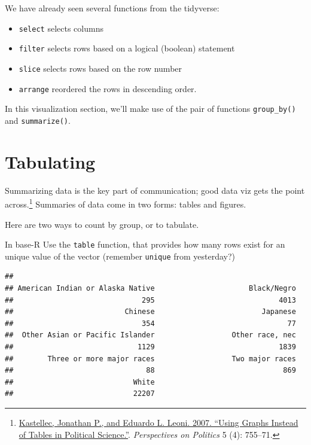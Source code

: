 \documentclass[]{book}
\newenvironment{Shaded}{\begin{snugshade}}{\end{snugshade}}
\newcommand{\KeywordTok}[1]{\textcolor[rgb]{0.13,0.29,0.53}{\textbf{#1}}}
\newcommand{\OperatorTok}[1]{\textcolor[rgb]{0.81,0.36,0.00}{\textbf{#1}}}
\newcommand{\NormalTok}[1]{#1}
\providecommand{\tightlist}{%
  \setlength{\itemsep}{0pt}\setlength{\parskip}{0pt}}
\let\rmarkdownfootnote\footnote%
\def\footnote{\protect\rmarkdownfootnote}
\theoremstyle{definition}
\theoremstyle{definition}
\theoremstyle{definition}
\theoremstyle{remark}
\begin{document}
We have already seen several functions from the tidyverse:

\begin{itemize}
\tightlist
\item
  \texttt{select} selects columns
\item
  \texttt{filter} selects rows based on a logical (boolean) statement
\item
  \texttt{slice} selects rows based on the row number
\item
  \texttt{arrange} reordered the rows in descending order.
\end{itemize}

In this visualization section, we'll make use of the pair of functions
\texttt{group\_by()} and \texttt{summarize()}.

\section{Tabulating}\label{tabulating}

Summarizing data is the key part of communication; good data viz gets
the point across.\footnote{\href{http://www.princeton.edu/~jkastell/Tables2Graphs/graphs.pdf}{Kastellec,
  Jonathan P., and Eduardo L. Leoni. 2007. ``Using Graphs Instead of
  Tables in Political Science.''}. \emph{Perspectives on Politics} 5
  (4): 755--71.} Summaries of data come in two forms: tables and
figures.

Here are two ways to count by group, or to tabulate.

In base-R Use the \texttt{table} function, that provides how many rows
exist for an unique value of the vector (remember \texttt{unique} from
yesterday?)

\begin{Shaded}
\end{Shaded}

\begin{verbatim}
## 
## American Indian or Alaska Native                      Black/Negro 
##                              295                             4013 
##                          Chinese                         Japanese 
##                              354                               77 
##  Other Asian or Pacific Islander                  Other race, nec 
##                             1129                             1839 
##        Three or more major races                  Two major races 
##                               88                              869 
##                            White 
##                            22207
\end{verbatim}
\end{document}
